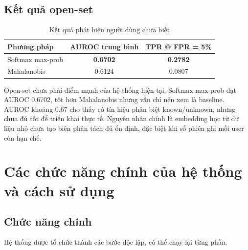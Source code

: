 \documentclass[12pt,a4paper]{article}
\begin{document}
\subsection{Kết quả open-set}

\begin{table}[H]
    \centering
    \caption{Kết quả phát hiện người dùng chưa biết}
    \label{tab:openset}
    \begin{tabular}{lcc}
        \toprule
        Phương pháp & AUROC trung bình & TPR @ FPR = 5\% \\
        \midrule
        Softmax max-prob & \textbf{0.6702} & \textbf{0.2782} \\
        Mahalanobis & 0.6124 & 0.0807 \\
        \bottomrule
    \end{tabular}
\end{table}

Open-set chưa phải điểm mạnh của hệ thống hiện tại. Softmax max-prob đạt AUROC 0.6702, tốt hơn Mahalanobis nhưng vẫn chỉ nên xem là baseline. AUROC khoảng 0.67 cho thấy có tín hiệu phân biệt known/unknown, nhưng chưa đủ tốt để triển khai thực tế. Nguyên nhân chính là embedding học từ dữ liệu nhỏ chưa tạo biên phân tách đủ ổn định, đặc biệt khi số phiên ghi mỗi user còn hạn chế.

\section{Các chức năng chính của hệ thống và cách sử dụng}

\subsection{Chức năng chính}

Hệ thống được tổ chức thành các bước độc lập, có thể chạy lại từng phần.
\end{document}
